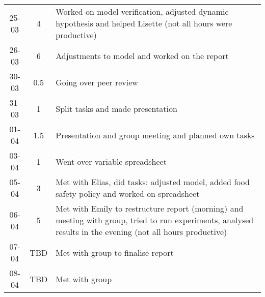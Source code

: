 \begin{longtable}[c]{c|c|m{35em}}
25-03 & 4 & Worked on model verification, adjusted dynamic hypothesis and helped Lisette (not all hours were productive) \\ 
26-03 & 6 & Adjustments to model and worked on the report \\ 
30-03 & 0.5 & Going over peer review \\
31-03 & 1 & Split tasks and made presentation \\
01-04 & 1.5 & Presentation and group meeting and planned own tasks \\ 
03-04 & 1 & Went over variable spreadsheet \\ 
05-04 & 3 & Met with Elias, did tasks: adjusted model, added food safety policy and worked on spreadsheet \\ 
06-04 & 5 & Met with Emily to restructure report (morning) and meeting with group, tried to run experiments, analysed results in the evening (not all hours productive) \\
07-04 & TBD & Met with group to finalise report \\ 
08-04 & TBD & Met with group 
\end{longtable}

